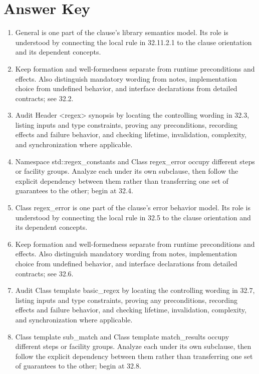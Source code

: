 \documentclass[11pt,letterpaper]{article}
\begin{document}
\clearpage\section{Answer Key}
\begin{enumerate}
\item General is one part of the clause's library semantics model. Its role is understood by connecting the local rule in 32.11.2.1 to the clause orientation and its dependent concepts.
\item Keep formation and well-formedness separate from runtime preconditions and effects. Also distinguish mandatory wording from notes, implementation choice from undefined behavior, and interface declarations from detailed contracts; see 32.2.
\item Audit Header <regex> synopsis by locating the controlling wording in 32.3, listing inputs and type constraints, proving any preconditions, recording effects and failure behavior, and checking lifetime, invalidation, complexity, and synchronization where applicable.
\item Namespace std::regex\_\allowbreak{}constants and Class regex\_\allowbreak{}error occupy different steps or facility groups. Analyze each under its own subclause, then follow the explicit dependency between them rather than transferring one set of guarantees to the other; begin at 32.4.
\item Class regex\_\allowbreak{}error is one part of the clause's error behavior model. Its role is understood by connecting the local rule in 32.5 to the clause orientation and its dependent concepts.
\item Keep formation and well-formedness separate from runtime preconditions and effects. Also distinguish mandatory wording from notes, implementation choice from undefined behavior, and interface declarations from detailed contracts; see 32.6.
\item Audit Class template basic\_\allowbreak{}regex by locating the controlling wording in 32.7, listing inputs and type constraints, proving any preconditions, recording effects and failure behavior, and checking lifetime, invalidation, complexity, and synchronization where applicable.
\item Class template sub\_\allowbreak{}match and Class template match\_\allowbreak{}results occupy different steps or facility groups. Analyze each under its own subclause, then follow the explicit dependency between them rather than transferring one set of guarantees to the other; begin at 32.8.

\end{enumerate}
\end{document}
